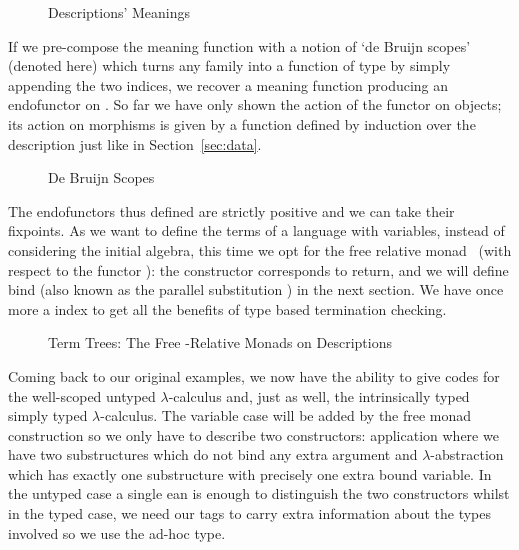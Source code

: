 \begin{figure}[h]
\caption{Descriptions' Meanings}
\end{figure}

If we pre-compose the meaning function  with a notion of `de Bruijn scopes'
(denoted  here) which turns any   family into a function
of type      by simply appending the two
 indices, we recover a meaning function producing an endofunctor on
 . So far we have only shown the action of the functor on objects;
its action on morphisms is given by a function  defined by induction over
the description just like in Section~\ref{sec:data}.

\begin{figure}[h]
\caption{De Bruijn Scopes}
\end{figure}

The endofunctors thus defined are strictly positive and we can take their fixpoints.
As we want to define the terms of a language with variables, instead of
considering the initial algebra, this time we opt for the free relative
monad~\cite{JFR4389} (with respect to the functor ): the 
constructor corresponds to return, and we will define bind (also known as
the parallel substitution ) in the next section. We have once more
a  index to get all the benefits of type based termination checking.

\begin{figure}[h]
\caption{Term Trees: The Free -Relative Monads on Descriptions}
\end{figure}

Coming back to our original examples, we now have the ability to give
codes for the well-scoped untyped $\lambda$-calculus and, just as well,
the intrinsically typed simply typed $\lambda$-calculus.
The variable case will be added by the free monad construction so we
only have to describe two constructors: application where we have two
substructures which do not bind any extra argument and $\lambda$-abstraction
which has exactly one substructure with precisely one extra bound variable.
In the untyped case a single ean is enough to distinguish the two constructors
whilst in the typed case, we need our tags to carry extra information about the
types involved so we use the ad-hoc  type.


